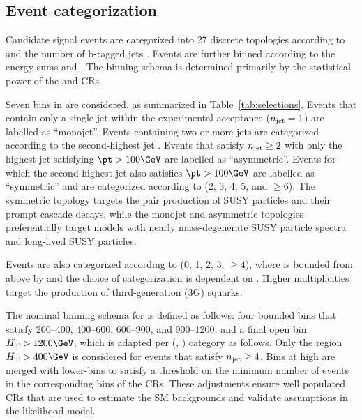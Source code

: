 \subsection{Event categorization}
\label{sec:categorization}

Candidate signal events are categorized into 27 discrete topologies
according to \njet and the number of b-tagged jets \nb. Events are
further binned according to the energy sums \scalht and \mht. The
binning schema is determined primarily by the statistical power of the
\mj and \mmj CRs. 

Seven bins in \njet are considered, as summarized in
Table~\ref{tab:selections}. Events that contain only a single jet
within the experimental acceptance ($n_{\mathrm{jet}} = 1$) are labelled as
``monojet''. Events containing two or more jets are categorized
according to the second-highest jet \pt. Events that satisfy $n_{\mathrm{jet}}
\geq 2$ with only the highest-\pt jet satisfying $\pt > 100\GeV$ are
labelled as ``asymmetric''. Events for which the second-highest jet
\pt also satisfies $\pt > 100\GeV$ are labelled as ``symmetric'' and
are categorized according to \njet (2, 3, 4, 5, and ${\geq}6$). The
symmetric topology targets the pair production of SUSY particles and
their prompt cascade decays, while the monojet and asymmetric
topologies preferentially target models with nearly mass-degenerate
SUSY particle spectra and long-lived SUSY particles.

Events are also categorized according to \nb (0, 1, 2, 3, ${\geq}4$),
where \nb is bounded from above by \njet and the choice of
categorization is dependent on \njet. Higher \nb multiplicities target
the production of third-generation (3G) squarks. 

The nominal binning schema for \scalht is defined as follows: four
bounded bins that satisfy 200--400, 400--600, 600--900, and
900--1200\GeV, and a final open bin $\scalht > 1200\GeV$, which is
adapted per (\njet, \nb) category as follows. Only the region $\scalht
> 400\GeV$ is considered for events that satisfy $n_{\mathrm{jet}} \geq 4$. Bins
at high \scalht are merged with lower-\scalht bins to satisfy a
threshold on the minimum number of events in the corresponding bins of
the CRs. These adjustments ensure well populated CRs that are used to
estimate the SM backgrounds and validate assumptions in the likelihood
model.

